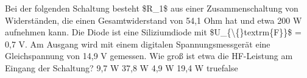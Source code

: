     {Bei der folgenden Schaltung besteht \$R\_1\$ aus einer Zusammenschaltung von Widerständen, die einen Gesamtwiderstand von 54,1 Ohm hat und etwa 200 W aufnehmen kann. Die Diode ist eine Siliziumdiode mit \$U\_\{\textbackslash\{\}textrm\{F\}\}\$ = 0,7 V. Am Ausgang wird mit einem digitalen Spannungsmessgerät eine Gleichspannung von 14,9 V gemessen. Wie groß ist etwa die HF-Leistung am Eingang der Schaltung?}
    {9,7 W}
    {37,8 W}
    {4,9 W}
    {19,4 W}
    {true}{false}